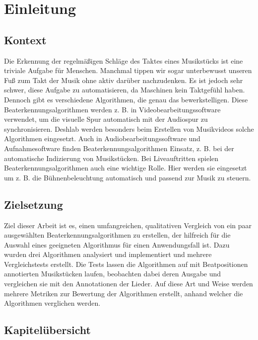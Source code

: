 \chapter{Einleitung}
\label{einleitung}

\section{Kontext}
{
	Die Erkennung der regelmä{\ss}igen Schläge des Taktes eines Musikstücks ist eine triviale Aufgabe für Menschen.
	Manchmal tippen wir sogar unterbewusst unseren Fu{\ss} zum Takt der Musik ohne aktiv darüber nachzudenken.
	Es ist jedoch sehr schwer,
		diese Aufgabe zu automatisieren,
		da Maschinen kein Taktgefühl haben.
	Dennoch gibt es verschiedene Algorithmen,
		die genau das bewerkstelligen.
	Diese Beaterkennungsalgorithmen werden z. B. in Videobearbeitungssoftware verwendet,
		um die visuelle Spur automatisch mit der Audiospur zu synchronisieren.
	Deshlab werden besonders beim Erstellen von Musikvideos solche Algorithmen eingesetzt.
	Auch in Audiobearbeitungssoftware und Aufnahmesoftware finden Beaterkennungsalgorithmen Einsatz,
		z. B. bei der automatische Indizierung von Musikstücken.
	Bei Liveauftritten spielen Beaterkennungsalgorithmen auch eine wichtige Rolle.
	Hier werden sie eingesetzt um z. B. die Bühnenbeleuchtung automatisch und passend zur Musik zu steuern.
}

\section{Zielsetzung}
{
	Ziel dieser Arbeit ist es,
		einen umfangreichen, qualitativen Vergleich von ein paar ausgewählten Beaterkennungsalgorithmen zu erstellen,
		der hilfreich für die Auswahl eines geeigneten Algorithmus für einen Anwendungsfall ist.
	Dazu wurden drei Algorithmen analysiert und implementiert
		und mehrere Vergleichstests erstellt.
	Die Tests lassen die Algorithmen auf mit Beatpositionen annotierten Musikstücken laufen,
		beobachten dabei deren Ausgabe
		und vergleichen sie mit den Annotationen der Lieder.
	Auf diese Art und Weise werden mehrere Metriken zur Bewertung der Algorithmen erstellt,
		anhand welcher die Algorithmen verglichen werden.
}

\section{Kapitelübersicht}
{
}

